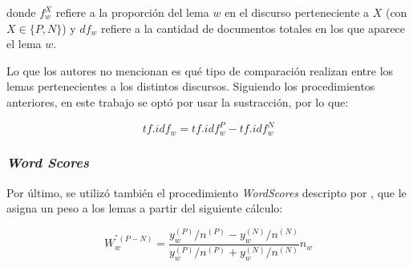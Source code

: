donde $f_{w}^{X}$ refiere a la proporci\'on del lema $w$ en el discurso
perteneciente a $X$ (con $X \in \lbrace P,N \rbrace$) y $df_w$ refiere a la
cantidad de documentos totales en los que aparece el lema $w$.
\par
Lo que los autores no mencionan es qu\'e tipo de comparaci\'on realizan entre los
lemas pertenecientes a los distintos discursos. Siguiendo los procedimientos
anteriores, en este trabajo se opt\'o por usar la sustracci\'on, por lo que:

\begin{equation*}
    tf.idf_{w} = tf.idf_{w}^{P}-tf.idf_{w}^{N}
\end{equation*}

\subsubsection{\textit{Word Scores}}
Por \'ultimo, se utiliz\'o tambi\'en el procedimiento \textit{WordScores} descripto por
\cite{laver2003extracting}, que le asigna un peso a los lemas a partir
del siguiente c\'alculo:

\begin{equation*}
    W_{w}^{^*(P-N)} = \frac{y_{w}^{(P)}/n^{(P)}-y_{w}^{(N)}/n^{(N)}}{y_{w}^{(P)}/n^{(P)}+y_{w}^{(N)}/n^{(N)}}n_{w}
\end{equation*}
